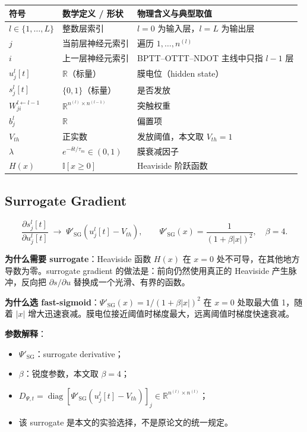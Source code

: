 \documentclass[journal,12pt,onecolumn]{IEEEtran}
\begin{document}
\begin{center}
\begin{tabular}{lll}
\toprule
符号 & 数学定义 / 形状 & 物理含义与典型取值 \\
\midrule
$l\in\{1,\dots,L\}$ & 整数层索引 & $l=0$ 为输入层，$l=L$ 为输出层 \\
$j$ & 当前层神经元索引 & 遍历 $1,\dots,n^{(l)}$ \\
$i$ & 上一层神经元索引 & BPTT--OTTT--NDOT 主线中只指 $l-1$ 层 \\
$u_j^l[t]$ & $\mathbb R$（标量） & 膜电位（hidden state） \\
$s_j^l[t]$ & $\{0,1\}$（标量） & 是否发放 \\
$W_{ji}^{l\leftarrow l-1}$ & $\mathbb R^{n^{(l)}\times n^{(l-1)}}$ & 突触权重 \\
$b_j^l$ & $\mathbb R$ & 偏置项 \\
$V_{th}$ & 正实数 & 发放阈值，本文取 $V_{th}=1$ \\
$\lambda$ & $e^{-\delta t/\tau_m}\in(0,1)$ & 膜衰减因子 \\
$H(x)$ & $\mathbb I[x\ge 0]$ & Heaviside 阶跃函数 \\
\bottomrule
\end{tabular}
\end{center}

\subsection{Surrogate Gradient}

\begin{equation}
\frac{\partial s_j^l[t]}{\partial u_j^l[t]}\;\to\;\Psi'_{\mathrm{SG}}(u_j^l[t]-V_{th}),
\qquad
\Psi'_{\mathrm{SG}}(x)=\frac{1}{(1+\beta|x|)^2},\quad \beta=4.
\end{equation}

\textbf{为什么需要 surrogate}：Heaviside 函数 $H(x)$ 在 $x=0$ 处不可导，在其他地方导数为零。surrogate gradient 的做法是：前向仍然使用真正的 Heaviside 产生脉冲，反向把 $\partial s/\partial u$ 替换成一个光滑、有界的函数。

\textbf{为什么选 fast-sigmoid}：$\Psi'_{\mathrm{SG}}(x)=1/(1+\beta|x|)^2$ 在 $x=0$ 处取最大值 1，随着 $|x|$ 增大迅速衰减。膜电位接近阈值时梯度最大，远离阈值时梯度快速衰减。

\textbf{参数解释}：
\begin{itemize}[leftmargin=1.5em,itemsep=0pt]
\item $\Psi'_{\mathrm{SG}}$：surrogate derivative；
\item $\beta$：锐度参数，本文取 $\beta=4$；
\item $D_{\Psi,t}=\operatorname{diag}[\Psi'_{\mathrm{SG}}(u_j^l[t]-V_{th})]_j\in\mathbb R^{n^{(l)}\times n^{(l)}}$；
\item 该 surrogate 是本文的实验选择，不是原论文的统一规定。
\end{itemize}
\end{document}
